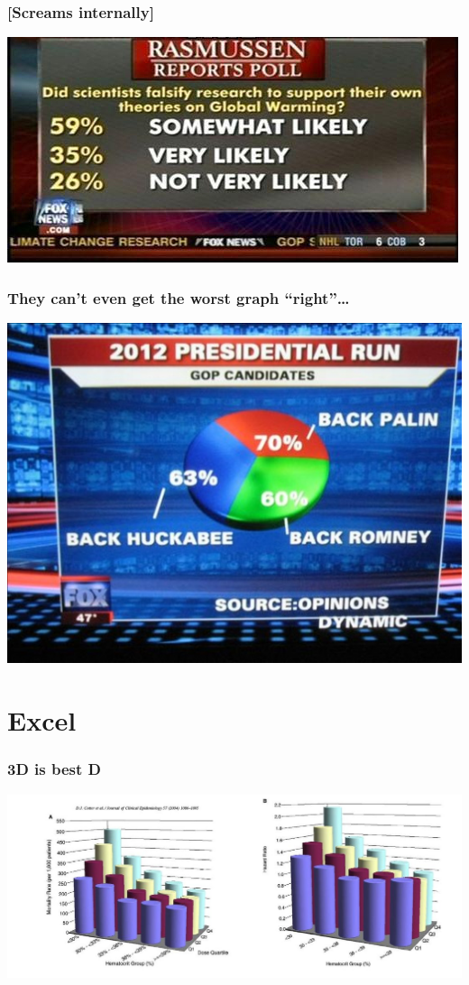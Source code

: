 \documentclass{beamer}
\begin{document}
\begin{frame}
  \frametitle{{[}Screams internally{]}}
  \includegraphics[width = \textwidth, keepaspectratio = true]{figure/fox_warming}
\end{frame}

\begin{frame}
  \frametitle{They can't even get the worst graph ``right''\ldots}
  \includegraphics[width = \textwidth, keepaspectratio = true]{figure/fox-news-piechart}
\end{frame}



\section{Excel}
\begin{frame}
  \frametitle{3D is best D}
  \includegraphics[width = \textwidth, keepaspectratio = true]{figure/cotter_fig2}
\end{frame}
\end{document}
